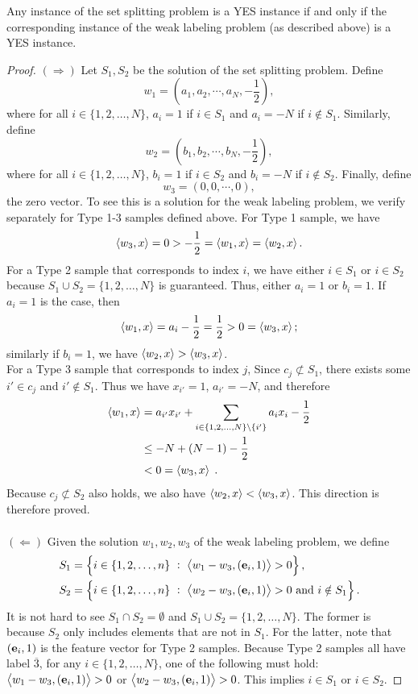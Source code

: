 \begin{lemma}
Any instance of the set splitting problem is a YES instance if and only if the
corresponding instance of the weak labeling problem (as described above) is a
YES instance.
\end{lemma}

\begin{proof}
$(\Longrightarrow)$ Let $S_1, S_2$ be the solution of the set splitting problem. Define
$$
w_1 = \left(a_1, a_2, \cdots, a_N, -\frac{1}{2}\right),
$$
where for all $i \in \{1,2,\dots,N\}$, $a_i=1$ if $i\in S_1$ and $a_i=-N$ if
$i\notin S_1$. Similarly, define
$$
w_2 = \left(b_1, b_2, \cdots, b_N, -\frac{1}{2}\right),
$$
where for all $i \in \{1,2,\dots,N\}$, $b_i=1$ if $i \in S_2$ and $b_i=-N$ if
$i\notin S_2$. Finally, define
$$
w_3 = (0,0,\cdots, 0),
$$
the zero vector. To see this is a solution for the weak labeling problem, we
verify separately for Type 1-3 samples defined above. For Type 1 sample, we have
$$
\left\langle w_3, x \right\rangle = 0 > -\frac{1}{2} = \left\langle w_1, x \right\rangle=\left\langle w_2, x \right\rangle.
$$
For a Type 2 sample that corresponds to index $i$, we have either $i\in S_1$ or
$i\in S_2$ because $S_1\cup S_2 = \{1,2,\dots,N\}$ is guaranteed. Thus, either
$a_i=1$ or $b_i=1$. If $a_i=1$ is the case, then
$$
\left\langle w_1, x \right\rangle = a_i - \frac{1}{2} = \frac{1}{2} > 0 = \left\langle w_3, x \right\rangle;
$$
similarly if $b_i=1$, we have $\left\langle w_2, x \right\rangle>\left\langle w_3, x \right\rangle$. \\ For a Type 3 sample
that corresponds to index $j$, Since $c_j \not\subset S_1$, there exists some
$i'\in c_j$ and $i'\notin S_1$. Thus we have $x_{i'}=1$, $a_{i'}=-N$, and
therefore
\begin{align*}
\left\langle w_1, x \right\rangle
& = a_{i'}x_{i'} + \sum_{i\in \{1,2,\dots,N\} \setminus \{i'\}} a_ix_i - \frac{1}{2} \\
& \le -N + (N-1)-\frac{1}{2} \\
& < 0 = \left\langle w_3, x \right\rangle \; .
\end{align*}
Because $c_j \not\subset S_2$ also holds, we also have
$\left\langle w_2, x \right\rangle<\left\langle w_3, x \right\rangle$. This direction is therefore proved. \\
\ \\
$(\Longleftarrow)$ Given the solution $w_1, w_2, w_3$ of the weak labeling problem, we define
\begin{align*}
S_1 &= \left\{i \in \{1,2,\dots,n\} ~:~ \left\langle w_1-w_3, (\mathbf{e}_i, 1) \right\rangle > 0 \right\}, \\
S_2 &= \left\{i \in \{1,2,\dots,n\} ~:~ \left\langle w_2-w_3, (\mathbf{e}_i, 1) \right\rangle > 0 \text{\ and\ } i\notin S_1 \right\}.
\end{align*}
It is not hard to see $S_1 \cap S_2 = \emptyset$ and $S_1\cup S_2 =
\{1,2,\dots,N\}$. The former is because $S_2$ only includes elements that are
not in $S_1$. For the latter, note that $(\mathbf{e}_i, 1)$ is the feature vector for
Type 2 samples. Because Type 2 samples all have label $\overline{3}$, for any $i
\in \{1,2,\dots,N\}$, one of the following must hold: $\left\langle w_1-w_3, (\mathbf{e}_i,
1) \right\rangle>0$ or $\left\langle w_2-w_3, (\mathbf{e}_i, 1) \right\rangle>0$. This implies $i\in S_1$ or $i\in S_2$.


\end{proof}
